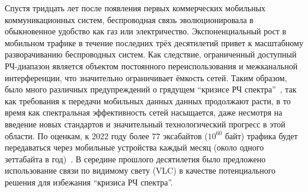 \Introduction


Спустя тридцать лет после появления первых коммерческих мобильных коммуникационных систем, беспроводная связь эволюционировала в обыкновенное удобство как газ или электричество. Экспоненциальный рост в мобильном трафике в течение последних трёх десятилетий привет к масштабному разворачиванию беспроводных систем. Как следствие, ограниченный доступный РЧ-диапазон является объектом постоянного переиспользования и межканальной интерференции, что значительно ограничивает ёмкость сетей. Таким образом, было много различных предупреждений о грядущем ``кризисе РЧ спектра''~\cite{Ofcom2013}, так как требования к передачи мобильных данных данных продолжают расти, в то время как спектральная эффективность сетей насыщается, даже несмотря на введение новых стандартов и значительный технологический прогресс в этой области. По оценкам, к 2022 году более $77$ эксабайтов ($10^{60}$ байт) трафика будет передаваться через мобильные устройства каждый месяц (около одного зеттабайта в год)~\cite{Cisco2019}. В середине прошлого десятилетия было предложено использование связи по видимому свету (VLC) в качестве потенциального решения для избежания ``кризиса РЧ спектра''.



